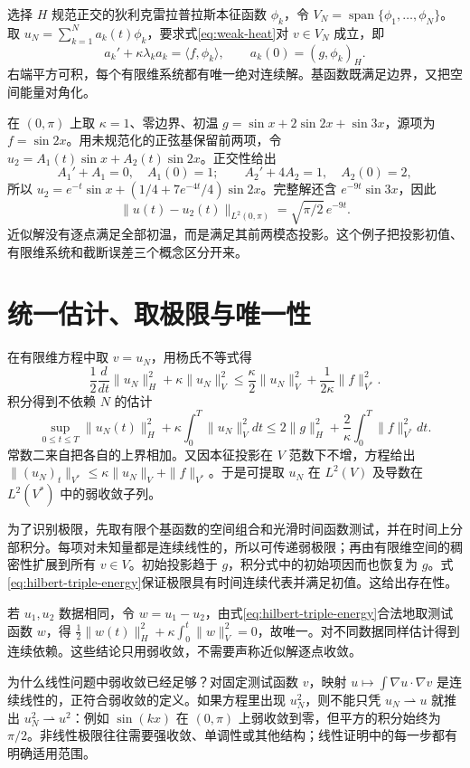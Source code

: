 \documentclass[UTF8,12pt,a4paper,fontset=fandol]{ctexbook}
\begin{document}
选择 $H$ 规范正交的狄利克雷拉普拉斯本征函数 $\phi_k$，令 $V_N=\operatorname{span}\{\phi_1,\ldots,\phi_N\}$。取 $u_N=\sum_{k=1}^Na_k(t)\phi_k$，要求式\eqref{eq:weak-heat}对 $v\in V_N$ 成立，即
\[
 a_k'+\kappa\lambda_ka_k=\langle f,\phi_k\rangle,
 \qquad a_k(0)=(g,\phi_k)_H.
\]
右端平方可积，每个有限维系统都有唯一绝对连续解。基函数既满足边界，又把空间能量对角化。

\begin{example}[前两个模态的近似解]
在 $(0,\pi)$ 上取 $\kappa=1$、零边界、初温 $g=\sin x+2\sin2x+\sin3x$，源项为 $f=\sin2x$。用未规范化的正弦基保留前两项，令 $u_2=A_1(t)\sin x+A_2(t)\sin2x$。正交性给出
\[
 A_1'+A_1=0,\quad A_1(0)=1;\qquad
 A_2'+4A_2=1,\quad A_2(0)=2,
\]
所以 $u_2=e^{-t}\sin x+(1/4+7e^{-4t}/4)\sin2x$。完整解还含 $e^{-9t}\sin3x$，因此
\[
 \|u(t)-u_2(t)\|_{L^2(0,\pi)}=\sqrt{\pi/2}\,e^{-9t}.
\]
近似解没有逐点满足全部初温，而是满足其前两模态投影。这个例子把投影初值、有限维系统和截断误差三个概念区分开来。
\end{example}

\section{统一估计、取极限与唯一性}
在有限维方程中取 $v=u_N$，用杨氏不等式得
\[
 \frac12\frac d{dt}\|u_N\|_H^2+\kappa\|u_N\|_V^2
 \le\frac\kappa2\|u_N\|_V^2+\frac1{2\kappa}\|f\|_{V^*}^2.
\]
积分得到不依赖 $N$ 的估计
\begin{equation}
 \sup_{0\le t\le T}\|u_N(t)\|_H^2
 +\kappa\int_0^T\|u_N\|_V^2dt
 \le 2\|g\|_H^2+\frac2\kappa\int_0^T\|f\|_{V^*}^2dt.
 \label{eq:galerkin-bound}
\end{equation}
常数二来自把各自的上界相加。又因本征投影在 $V$ 范数下不增，方程给出 $\|(u_N)_t\|_{V^*}\le\kappa\|u_N\|_V+\|f\|_{V^*}$。于是可提取 $u_N$ 在 $L^2(V)$ 及导数在 $L^2(V^*)$ 中的弱收敛子列。

为了识别极限，先取有限个基函数的空间组合和光滑时间函数测试，并在时间上分部积分。每项对未知量都是连续线性的，所以可传递弱极限；再由有限维空间的稠密性扩展到所有 $v\in V$。初始投影趋于 $g$，积分式中的初始项因而也恢复为 $g$。式\eqref{eq:hilbert-triple-energy}保证极限具有时间连续代表并满足初值。这给出存在性。

若 $u_1,u_2$ 数据相同，令 $w=u_1-u_2$，由式\eqref{eq:hilbert-triple-energy}合法地取测试函数 $w$，得 $\frac12\|w(t)\|_H^2+\kappa\int_0^t\|w\|_V^2=0$，故唯一。对不同数据同样估计得到连续依赖。这些结论只用弱收敛，不需要声称近似解逐点收敛。

为什么线性问题中弱收敛已经足够？对固定测试函数 $v$，映射 $u\mapsto\int\nabla u\cdot\nabla v$ 是连续线性的，正符合弱收敛的定义。如果方程里出现 $u_N^2$，则不能只凭 $u_N\rightharpoonup u$ 就推出 $u_N^2\rightharpoonup u^2$：例如 $\sin(kx)$ 在 $(0,\pi)$ 上弱收敛到零，但平方的积分始终为 $\pi/2$。非线性极限往往需要强收敛、单调性或其他结构；线性证明中的每一步都有明确适用范围。
\end{document}

